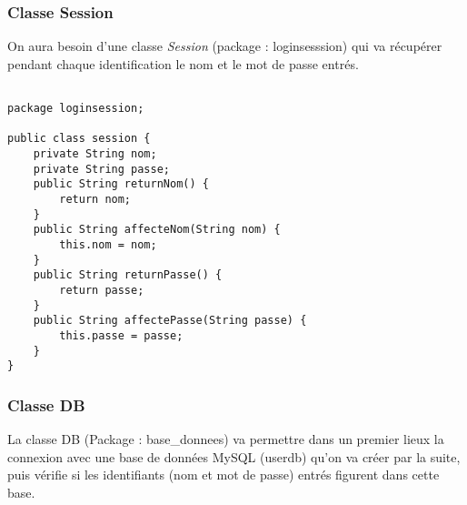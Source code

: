 \documentclass[12]{article}
\begin{document}
\subsubsection{Classe Session}
On aura besoin d'une classe \textit{Session} (package : loginsesssion) qui va récupérer pendant chaque identification le nom et le mot de passe entrés.\\

\begin{scriptsize}
\lstset{language=java}
\begin{lstlisting}

package loginsession;

public class session {
	private String nom;
	private String passe;
	public String returnNom() {
		return nom;
	}
	public String affecteNom(String nom) {
		this.nom = nom;
	}
	public String returnPasse() {
		return passe;
	}
	public String affectePasse(String passe) {
		this.passe = passe;
	}
}

\end{lstlisting}
\end{scriptsize}

\subsubsection{Classe DB}

La classe DB (Package : base\_donnees) va permettre dans un premier lieux la connexion avec une base de données MySQL (userdb) qu'on va créer par la suite, puis vérifie si les identifiants (nom et mot de passe) entrés figurent dans cette base.\\

\newpage
\end{document}
